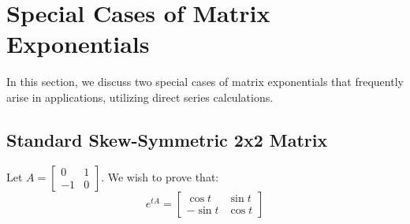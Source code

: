 \documentclass[12pt,a4paper]{report}
\theoremstyle{definition}
\numberwithin{equation}{chapter}
\begin{document}
\section{Special Cases of Matrix Exponentials}
In this section, we discuss two special cases of matrix exponentials that frequently arise in applications, utilizing direct series calculations.

\subsection{Standard Skew-Symmetric 2x2 Matrix}
Let $A = \begin{bmatrix} 0 & 1 \\ -1 & 0 \end{bmatrix}$. We wish to prove that:
\begin{equation}
e^{tA} = \begin{bmatrix} \cos t & \sin t \\ -\sin t & \cos t \end{bmatrix}
\end{equation}
\end{document}
